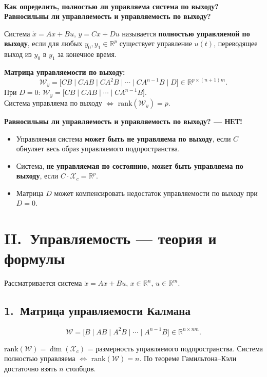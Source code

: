 \documentclass[12pt,a4paper]{article}
\begin{document}
	\begin{qblock}
		\\
		{\bfseries Как определить, полностью ли управляема система по выходу? Равносильны ли управляемость и управляемость по выходу?}
		
		\medskip
		Система $\dot{x}=Ax+Bu$, $y=Cx+Du$ называется \textbf{полностью управляемой по выходу},
		если для любых $y_0, y_1 \in \mathbb{R}^p$ существует управление $u(t)$,
		переводящее выход из $y_0$ в $y_1$ за конечное время.
		
		\medskip
		\textbf{Матрица управляемости по выходу:}
		\[
		\mathcal{W}_y = \bigl[CB \mid CAB \mid CA^2B \mid \cdots \mid CA^{n-1}B \mid D\bigr] \in \mathbb{R}^{p \times (n+1)m}.
		\]
		При $D=0$: $\mathcal{W}_y = \bigl[CB \mid CAB \mid \cdots \mid CA^{n-1}B\bigr]$.\\
		Система управляема по выходу $\Longleftrightarrow$ $\mathrm{rank}(\mathcal{W}_y) = p$.
		
		\medskip
		\textbf{Равносильны ли управляемость и управляемость по выходу? --- НЕТ!}
		\begin{itemize}[leftmargin=20pt, itemsep=2pt]
			\item Управляемая система \textbf{может быть не управляема по выходу}, если $C$
			обнуляет весь образ управляемого подпространства.
			\item Система, \textbf{не управляемая по состоянию, может быть управляема по выходу},
			если $C \cdot \mathcal{X}_c = \mathbb{R}^p$.
			\item Матрица $D$ может компенсировать недостаток управляемости по выходу при $D=0$.
		\end{itemize}
	\end{qblock}
	
	\newpage
	\section{II.~Управляемость --- теория и формулы}
	
	Рассматривается система $\dot{x} = Ax + Bu$, $x \in \mathbb{R}^n$, $u \in \mathbb{R}^m$.
	
	\subsection{1.~Матрица управляемости Калмана}
	\begin{formulabox}
		\[
		\mathcal{W} = \bigl[B \mid AB \mid A^2B \mid \cdots \mid A^{n-1}B\bigr] \in \mathbb{R}^{n \times nm}.
		\]
	\end{formulabox}
	$\mathrm{rank}(\mathcal{W}) = \dim(\mathcal{X}_c)$ = размерность управляемого подпространства.
	Система полностью управляема $\Leftrightarrow$ $\mathrm{rank}(\mathcal{W}) = n$.
	По теореме Гамильтона--Кэли достаточно взять $n$ столбцов.
	
\end{document}
